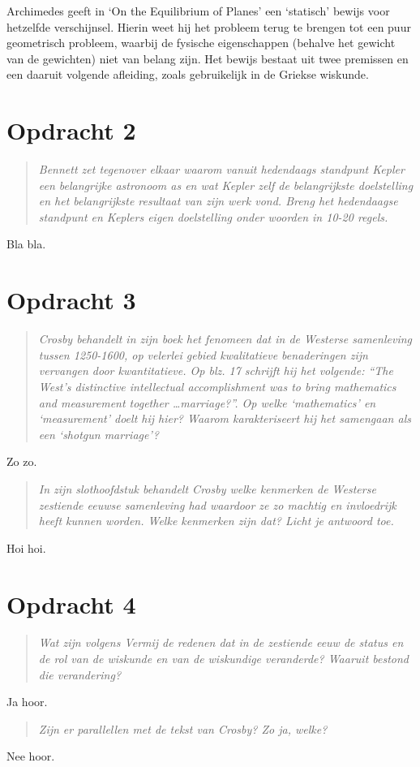 \documentclass[a4paper,11pt]{article}
\begin{document}
Archimedes geeft in `On the Equilibrium of Planes' een `statisch' bewijs voor
hetzelfde verschijnsel. Hierin weet hij het probleem terug te brengen tot een
puur geometrisch probleem, waarbij de fysische eigenschappen (behalve het
gewicht van de gewichten) niet van belang zijn. Het bewijs bestaat uit twee
premissen en een daaruit volgende afleiding, zoals gebruikelijk in de Griekse
wiskunde.


\section*{Opdracht 2}


\begin{quote}
\emph{Bennett zet tegenover elkaar waarom vanuit hedendaags standpunt Kepler
  een belangrijke astronoom as en wat Kepler zelf de belangrijkste
  doelstelling en het belangrijkste resultaat van zijn werk vond. Breng het
  hedendaagse standpunt en Keplers eigen doelstelling onder woorden in 10-20
  regels.}
\end{quote}


Bla bla.


\section*{Opdracht 3}


\begin{quote}
\emph{Crosby behandelt in zijn boek het fenomeen dat in de Westerse
  samenleving tussen 1250-1600, op velerlei gebied kwalitatieve benaderingen
  zijn vervangen door kwantitatieve. Op blz. 17 schrijft hij het volgende:
  ``The West's distinctive intellectual accomplishment was to bring
  mathematics and measurement together \ldots marriage?''. Op welke
  `mathematics' en `measurement' doelt hij hier? Waarom karakteriseert hij het
  samengaan als een `shotgun marriage'?}
\end{quote}


Zo zo.


\begin{quote}
\emph{In zijn slothoofdstuk behandelt Crosby welke kenmerken de Westerse
  zestiende eeuwse samenleving had waardoor ze zo machtig en invloedrijk heeft
  kunnen worden. Welke kenmerken zijn dat? Licht je antwoord toe.}
\end{quote}

Hoi hoi.


\section*{Opdracht 4}


\begin{quote}
\emph{Wat zijn volgens Vermij de redenen dat in de zestiende eeuw de status en
  de rol van de wiskunde en van de wiskundige veranderde? Waaruit bestond die
  verandering?}
\end{quote}


Ja hoor.


\begin{quote}
\emph{Zijn er parallellen met de tekst van Crosby? Zo ja, welke?}
\end{quote}


Nee hoor.
\end{document}
